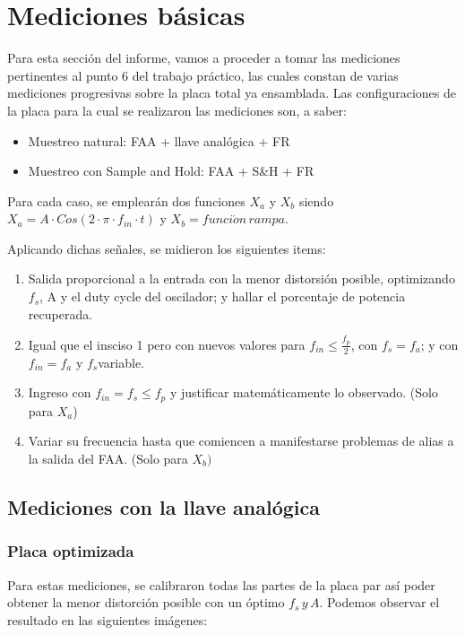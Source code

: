 \documentclass[../../ASSD_TP1_G7.tex]{subfiles}
\begin{document}
\chapter*{Mediciones b\'asicas}

Para esta sección del informe, vamos a proceder a tomar las mediciones
pertinentes al punto 6 del trabajo práctico, las cuales constan de
varias mediciones progresivas sobre la placa total ya ensamblada.
Las configuraciones de la placa para la cual se realizaron las mediciones
son, a saber:
\begin{itemize}
\item Muestreo natural: FAA + llave analógica + FR~
\item Muestreo con Sample and Hold: FAA + S\&H + FR
\end{itemize}
Para cada caso, se emplearán dos funciones $X_{a}$ y $X_{b}$ siendo
$X_{a}=A\cdot Cos(2\cdot\pi\cdot f_{in}\cdot t)$ y $X_{b}=funci\acute{o}n\,rampa$.

Aplicando dichas señales, se midieron los siguientes items:
\begin{enumerate}
\item Salida proporcional a la entrada con la menor distorsión posible,
optimizando $f_{s}$, A y el duty cycle del oscilador; y hallar el
porcentaje de potencia recuperada.
\item Igual que el insciso 1 pero con nuevos valores para $f_{in}\leq\frac{f_{p}}{2}$,
con $f_{s}=f_{a}$; y con $f_{in}=f_{a}$ y $f_{s}$variable.
\item Ingreso con $f_{in}=f_{s}\leq f_{p}$ y justificar matemáticamente
lo observado. (Solo para $X_{a}$)
\item Variar su frecuencia hasta que comiencen a manifestarse problemas
de alias a la salida del FAA. (Solo para $X_{b})$
\end{enumerate}

\section{Mediciones con la llave analógica}

\subsection{Placa optimizada}

Para estas mediciones, se calibraron todas las partes de la placa
par así poder obtener la menor distorción posible con un óptimo $f_{s}\,y\,A$.
Podemos observar el resultado en las siguientes imágenes:
\end{document}
